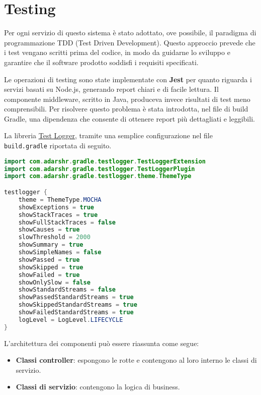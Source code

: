 \chapter{Testing}
\label{ch:testing}

Per ogni servizio di questo sistema è stato adottato, ove possibile, il paradigma di programmazione TDD (Test Driven Development). Questo approccio prevede che i test vengano scritti prima del codice, in modo da guidarne lo sviluppo e garantire che il software prodotto soddisfi i requisiti specificati.

Le operazioni di testing sono state implementate con \textbf{Jest} per quanto riguarda i servizi basati su Node.js, generando report chiari e di facile lettura. Il componente middleware, scritto in Java, produceva invece risultati di test meno comprensibili. Per risolvere questo problema è stata introdotta, nel file di build Gradle, una dipendenza che consente di ottenere report più dettagliati e leggibili.

La libreria \href{https://plugins.gradle.org/plugin/com.adarshr.test-logger}{\underline{Test Logger}}, tramite una semplice configurazione nel file \texttt{build.gradle} riportata di seguito.

\begin{lstlisting}[language=Java, caption={Configurazione del Test Logger}, label=list:gradle_testlogger]
import com.adarshr.gradle.testlogger.TestLoggerExtension
import com.adarshr.gradle.testlogger.TestLoggerPlugin
import com.adarshr.gradle.testlogger.theme.ThemeType

testlogger {
    theme = ThemeType.MOCHA
    showExceptions = true
    showStackTraces = true
    showFullStackTraces = false
    showCauses = true
    slowThreshold = 2000
    showSummary = true
    showSimpleNames = false
    showPassed = true
    showSkipped = true
    showFailed = true
    showOnlySlow = false
    showStandardStreams = false
    showPassedStandardStreams = true
    showSkippedStandardStreams = true
    showFailedStandardStreams = true
    logLevel = LogLevel.LIFECYCLE
}
\end{lstlisting}
\vspace{1cm}

L’architettura dei componenti può essere riassunta come segue:
\begin{itemize}
    \item \textbf{Classi controller}: espongono le rotte e contengono al loro interno le classi di servizio.
    \item \textbf{Classi di servizio}: contengono la logica di business.
\end{itemize}

